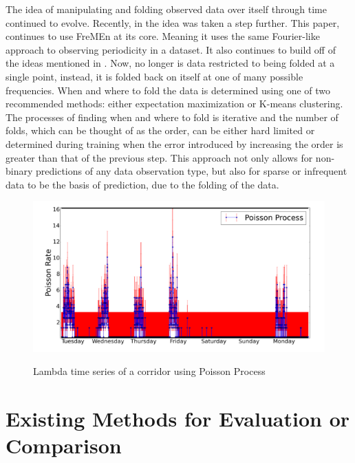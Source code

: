  The idea of manipulating and folding observed data over itself through time
  continued to evolve. Recently, in
  \cite{Krajnik2018} the idea was taken a step further. This paper, continues
  to use FreMEn at its core. Meaning it uses the same Fourier-like approach to observing
  periodicity in a dataset. It also continues to build off of the ideas mentioned
  in \cite{Jovan2016}. Now, no longer is data restricted to being folded at a
  single point, instead, it is folded back on itself at one of many possible
  frequencies. When and where to fold the data is determined using one of two
  recommended methods: either expectation maximization or K-means clustering.
  The processes of finding when and where to fold is iterative and the number
  of folds, which can be thought of as the order, can be either hard limited
  or determined during training when the error introduced by increasing the
  order is greater than that of the previous step. This approach not only allows
  for non-binary predictions of any data observation type, but also
  for sparse or infrequent data to be the basis of prediction, due to the
  folding of the data. \\



  \begin{figure}[!htb]
    \centering
    \includegraphics[width=\linewidth]{images/poisson-spectral-process.png}
    \caption{Lambda time series of a corridor using Poisson Process}
    \cite{Jovan2016}
    \label{figure:PSP}
  \end{figure}


  \section{ Existing Methods for Evaluation or Comparison }

